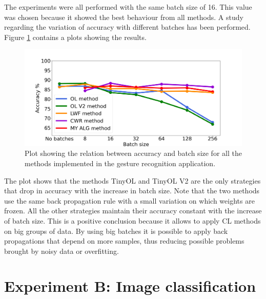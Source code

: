 \documentclass[12pt]{report}
\begin{document}
The experiments were all performed with the same batch size of 16. This value was chosen because it showed the best behaviour from all methods. A study regarding the variation of accuracy with different batches has been performed. Figure \ref{fig:batch_size_letter} contains a plots showing the results.

\begin{figure}[h!]
    \centering
    \includegraphics[width=140mm]{Figures/Chapter5/batch_size_letters.png} 
    \caption{Plot showing the relation between accuracy and batch size for all the methods implemented in the gesture recognition application.}
    \label{fig:batch_size_letter}    
\end{figure}

The plot shows that the methods TinyOL and TinyOL V2 are the only strategies that drop in accuracy with the increase in batch size. Note that the two methods use the same back propagation rule with a small variation on which weights are frozen. All the other strategies maintain their accuracy constant with the increase of batch size. This is a positive conclusion because it allows to apply CL methods on big groups of data. By using big batches it is possible to apply back propagations that depend on more samples, thus reducing possible problems brought by noisy data or overfitting.

\section{Experiment B: Image classification}
\end{document}
